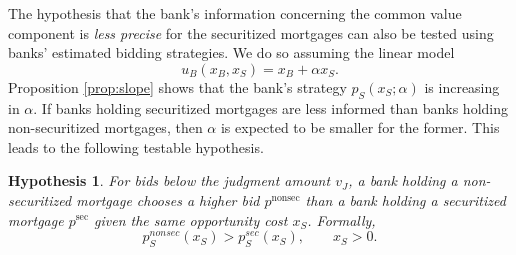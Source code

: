 \documentclass[11pt,twopage]{article}
\newtheorem{conjecture}{Hypothesis}
{\bf}{\it}
\begin{document}
%

The hypothesis that the bank's information concerning the common value
component is \emph{less precise} for the securitized mortgages can
also be tested using banks' estimated bidding strategies. We do so
assuming the linear model
\[
u_B(x_B,x_S) = x_B+\alpha x_S .
\]
Proposition \ref{prop:slope} shows that the bank's strategy
$p_S(x_S;\alpha)$ is increasing in $\alpha$.  If banks holding
securitized mortgages are less informed than banks holding
non-securitized mortgages, then $\alpha$ is expected to be smaller for
the former. This leads to the following testable hypothesis.
%


\begin{conjecture}\label{hyp:slope}
  For bids below the judgment amount $v_J$, a bank holding a
  non-securitized mortgage chooses a higher bid $p^\text{nonsec}$ than
  a bank holding a securitized mortgage $p^\text{sec}$ given the same
  opportunity cost $x_S$. Formally, \[ p_S^{nonsec}(x_S) >
  p_S^{sec}(x_S), \quad\quad x_S>0 .\] \end{conjecture}
\end{document}
